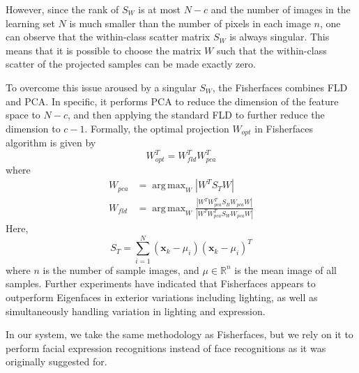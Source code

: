 \documentclass[10pt,twocolumn,letterpaper]{article}
\DeclareMathOperator*{\argmax}{arg\,max}
\newcommand{\xvec}{\mathbf{x}}
\newcommand{\R}{\mathbb{R}}
\begin{document}
However, since the rank of $S_W$ is at most $N - c$ and the number of images in the learning set $N$ is much smaller than the number of pixels in each image $n$, one can observe that the within-class scatter matrix $S_W$ is always singular. This means that it is possible to choose the matrix $W$ such that the within-class scatter of the projected samples can be made exactly zero. 

To overcome this issue aroused by a singular $S_W$, the Fisherfaces combines FLD and PCA. In specific, it performs PCA to reduce the dimension of the feature space to $N - c$, and then applying the standard FLD to further reduce the dimension to $c - 1$. Formally, the optimal projection $W_{opt}$ in Fisherfaces algorithm is given by
\[W_{opt}^T = W_{fld}^T W_{pca}^T\]
where
\begin{align*}
    W_{pca} &= \argmax_W |W^T S_T W| \\
    W_{fld} &= \argmax_W \frac{|W^T W_{pca}^T S_B W_{pca} W|}{|W^T W_{pca}^T S_W W_{pca} W|}
\end{align*}
Here, 
\[S_T = \sum\limits_{i = 1}^N (\xvec_k - \mu_i)(\xvec_k - \mu_i)^T\]
where $n$ is the number of sample images, and $\mu \in \R^n$ is the mean image of all samples. Further experiments have indicated that Fisherfaces appears to outperform Eigenfaces in exterior variations including lighting, as well as simultaneously handling variation in lighting and expression. \cite{Article06}

In our system, we take the same methodology as Fisherfaces, but we rely on it to perform facial expression recognitions instead of face recognitions as it was originally suggested for.
\end{document}
